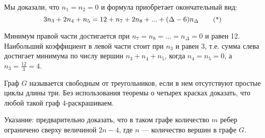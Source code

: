 \documentclass[a4paper,12pt]{article}
\numberwithin{figure}{section}
\begin{document}
\begin{solution}
	Мы доказали, что $n_1=n_2=0$ и формула приобретает окончательный вид:
	\[ 3n_3+2n_4+n_5 = 12+n_7+2n_8+...+(\Delta-6)n_{\Delta}
	   \qquad\text{\small(*)} \]

	Минимум правой части достигается при $n_7=n_8=...=n_{\Delta}=0$ и равен 12. Наибольший коэффициент в левой части стоит при $n_3$ и равен 3, т.е. сумма слева достигает минимума по числу вершин $n_3+n_4+n_5$, когда $n_4=n_5=0$, а $n_3=\frac{12}{3}=4$.
\end{solution}


\begin{problem}
	Граф $G$ называется свободным от треугольников, если в нем отсутствуют простые циклы длины три. Без использования теоремы о четырех красках доказать, что любой такой граф 4-раскрашиваем.

	Указание: предварительно доказать, что в таком графе количество $m$ ребер ограничено сверху величиной $2n-4$, где $n$ --- количество вершин в графе $G$. 
\end{problem}
\end{document}
